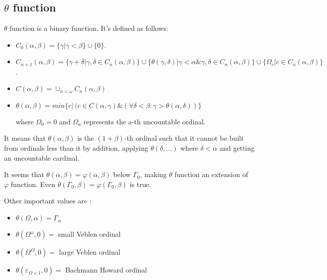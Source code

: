 \documentclass[10pt]{article}
\begin{document}
\subsection{\( \theta \) function}

\( \theta  \) function is a binary function. It’s defined as follows:

\begin{itemize}

\item \( C_0(\alpha,\beta) = \lbrace \gamma|\gamma<\beta \rbrace \cup \lbrace 0 \rbrace \).

\item \( C_{n+1}(\alpha,\beta) = \lbrace \gamma+\delta|\gamma,\delta \in C_n(\alpha,\beta) \rbrace \cup \lbrace \theta(\gamma,\delta)|\gamma<\alpha \& \gamma,\delta \in C_n(\alpha,\beta) \rbrace \cup \lbrace \Omega_c|c \in C_n(\alpha,\beta) \rbrace \).

\item \( C(\alpha,\beta) = \cup_{n<\omega} C_n(\alpha,\beta) \)

\item \( \theta(\alpha,\beta) = min \lbrace c|~(c \in C(\alpha,\gamma) \& (\forall \delta<\beta:\gamma>\theta(\alpha,\delta)) \rbrace \)

where \( \Omega_0 = 0 \) and \( \Omega_a \) represents the a-th uncountable ordinal.

\end{itemize}

It means that \( \theta(\alpha,\beta) \) is the \( (1+\beta) \)-th ordinal such that it cannot be built from ordinals less than it by addition, applying \( \theta(\delta,\ldots) \) where \( \delta < \alpha \) and getting an uncountable cardinal.

It seems that \( \theta(\alpha,\beta) = \varphi(\alpha,\beta) \) below \( \Gamma_0 \), making \( \theta \) function an extension of \( \varphi \) function. Even \( \theta(\Gamma_0,\beta) = \varphi(\Gamma_0,\beta) \) is true.

\bigskip

Other important values are :

\begin{itemize}

\item \( \theta(\Omega,\alpha) = \Gamma_\alpha \)

\item \( \theta(\Omega^\omega,0) = \) small Veblen ordinal

\item \( \theta(\Omega^\Omega,0) = \) large Veblen ordinal

\item \( \theta(\varepsilon_{\Omega+1},0) = \) Bachmann Howard ordinal

\end{itemize}
\end{document}
